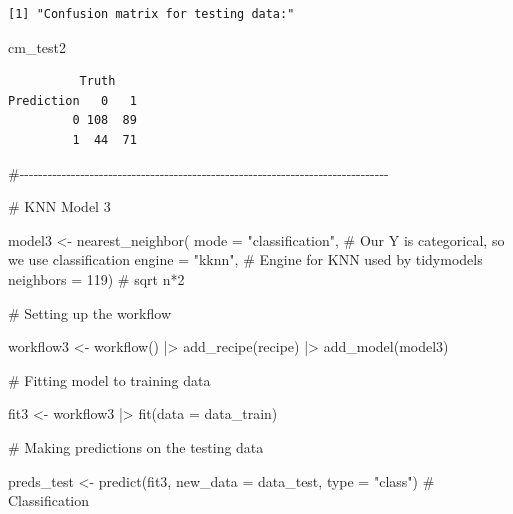 \documentclass[
  letterpaper,
  DIV=11,
  numbers=noendperiod]{scrartcl}
\newenvironment{Shaded}{\begin{snugshade}}{\end{snugshade}}
\newcommand{\AttributeTok}[1]{\textcolor[rgb]{0.40,0.45,0.13}{#1}}
\newcommand{\CommentTok}[1]{\textcolor[rgb]{0.37,0.37,0.37}{#1}}
\newcommand{\DecValTok}[1]{\textcolor[rgb]{0.68,0.00,0.00}{#1}}
\newcommand{\FunctionTok}[1]{\textcolor[rgb]{0.28,0.35,0.67}{#1}}
\newcommand{\NormalTok}[1]{\textcolor[rgb]{0.00,0.23,0.31}{#1}}
\newcommand{\OtherTok}[1]{\textcolor[rgb]{0.00,0.23,0.31}{#1}}
\newcommand{\SpecialCharTok}[1]{\textcolor[rgb]{0.37,0.37,0.37}{#1}}
\newcommand{\StringTok}[1]{\textcolor[rgb]{0.13,0.47,0.30}{#1}}
\begin{document}
\begin{verbatim}
[1] "Confusion matrix for testing data:"
\end{verbatim}

\begin{Shaded}
\begin{Highlighting}[]
\NormalTok{cm\_test2}
\end{Highlighting}
\end{Shaded}

\begin{verbatim}
          Truth
Prediction   0   1
         0 108  89
         1  44  71
\end{verbatim}

\begin{Shaded}
\begin{Highlighting}[]
\CommentTok{\#{-}{-}{-}{-}{-}{-}{-}{-}{-}{-}{-}{-}{-}{-}{-}{-}{-}{-}{-}{-}{-}{-}{-}{-}{-}{-}{-}{-}{-}{-}{-}{-}{-}{-}{-}{-}{-}{-}{-}{-}{-}{-}{-}{-}{-}{-}{-}{-}{-}{-}{-}{-}{-}{-}{-}{-}{-}{-}{-}{-}{-}{-}{-}{-}{-}{-}{-}{-}{-}{-}{-}{-}{-}{-}{-}{-}{-}{-}{-}}

\CommentTok{\# KNN Model 3}

\NormalTok{model3 }\OtherTok{\textless{}{-}} \FunctionTok{nearest\_neighbor}\NormalTok{(}
  \AttributeTok{mode =} \StringTok{"classification"}\NormalTok{, }\CommentTok{\# Our Y is categorical, so we use classification}
  \AttributeTok{engine =} \StringTok{"kknn"}\NormalTok{, }\CommentTok{\# Engine for KNN used by tidymodels}
  \AttributeTok{neighbors =} \DecValTok{119}\NormalTok{) }\CommentTok{\# sqrt n*2}


\CommentTok{\# Setting up the workflow}

\NormalTok{workflow3 }\OtherTok{\textless{}{-}} \FunctionTok{workflow}\NormalTok{() }\SpecialCharTok{|\textgreater{}}
  \FunctionTok{add\_recipe}\NormalTok{(recipe) }\SpecialCharTok{|\textgreater{}}
  \FunctionTok{add\_model}\NormalTok{(model3)}


\CommentTok{\# Fitting model to training data}

\NormalTok{fit3 }\OtherTok{\textless{}{-}}\NormalTok{ workflow3 }\SpecialCharTok{|\textgreater{}}
  \FunctionTok{fit}\NormalTok{(}\AttributeTok{data =}\NormalTok{ data\_train)}


\CommentTok{\# Making predictions on the testing data}

\NormalTok{preds\_test }\OtherTok{\textless{}{-}} \FunctionTok{predict}\NormalTok{(fit3, }
                      \AttributeTok{new\_data =}\NormalTok{ data\_test, }
                      \AttributeTok{type =} \StringTok{"class"}\NormalTok{) }\CommentTok{\# Classification}


\end{Highlighting}
\end{Shaded}
\end{document}
